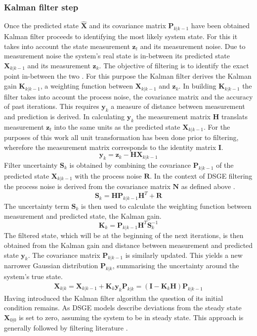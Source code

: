 \documentclass[12pt,a4paper,english]{article} %
\newcommand{\matr}[1]{\mathbf{#1}} %
\begin{document}
	\subsubsection{Kalman filter step}
	Once the predicted state $\matr{\hat{X}}$ and its covariance matrix $\matr{P}_{k| k-1}$ have been obtained Kalman filter proceeds to identifying the most likely system state. For this it takes into account the state measurement $\matr{z}_t$ and its measurement noise. 
	Due to measurement noise the system's real state is in-between its predicted state $\matr{X}_{k| k-1}$ and its measurement $\matr{z}_k$. The objective of filtering is to identify the exact point in-between the two \cite{andrews_kalman_2008}. For this purpose the Kalman filter derives the Kalman gain $\matr{K}_{k| k-1}$, a weighting function between $\matr{X}_{k| k-1}$ and $\matr{z}_k$. In building $\matr{K}_{k| k-1}$ the filter takes into account the process noise, the covariance matrix and the accuracy of past iterations.	
	This requires $\matr{y}_k$ a measure of distance between measurement and prediction is derived. In calculating $\matr{y}_k$ the measurement matrix $\matr H$ translats measurement $\matr{z}_t$ into the same units as the predicted state $\matr{X}_{k| k-1}$. For the purposes of this work all unit transformation has been done prior to filtering, wherefore the measurement matrix corresponds to the identity matrix $\matr{I}$.
	\[
		\matr{y}_{k} = \matr{z}_k - \matr H \matr{X}_{k| k-1}
	\]
	Filter uncertainty $\matr{S}_k$ is obtained by combining the covariance $\matr{P}_{k| k-1}$ of the predicted state $\matr{X}_{k| k-1}$ with the process noise $\matr{R}$. In the context of DSGE filtering the process noise is derived from the covariance matrix $\matr{N}$ as defined above \cite{guerron-quintana_bayesian_2013}.
	\[
		\matr{S}_k = \matr H \matr{P}_{k| k-1} \matr{H}^T + \matr{R}
	\]
	The uncertainty term $\matr{S}_{k}$ is then used to calculate the weighting function between measurement and predicted state, the Kalman gain. 
	\[
		\matr{K}_k = \matr{P}_{k| k-1} \matr{H}^T \matr{S}_{k}^{-1}
	\]
	The filtered state, which will be at the beginning of the next iterations, is then obtained from the Kalman gain and distance between measurement and predicted state $\matr{y}_k$. The covariance matrix $\matr{P}_{k|k-1}$ is similarly updated. This yields a new narrower Gaussian distribution $\matr{P}_{k|k}$, summarising the uncertainty around the system's true state.
	\begin{equation}
		\begin{aligned}
			\matr{X}_{k|k} = \matr{X}_{k| k-1} + \matr{K}_k \matr{y}_k
			\matr{P}_{k|k} = (\matr I - \matr{K}_k \matr{H}) \matr{P}_{k|k-1}		
		\end{aligned}
	\end{equation}
	Having introduced the Kalman filter algorithm the question of its initial condition remains. As DSGE models describe deviations from the steady state $\matr{X}_{0|0}$ is set to zero, assuming the system to be in steady state. This approach is generally followed by filtering literature \cite{schorfheide_loss_2000}. 
	
\end{document}
